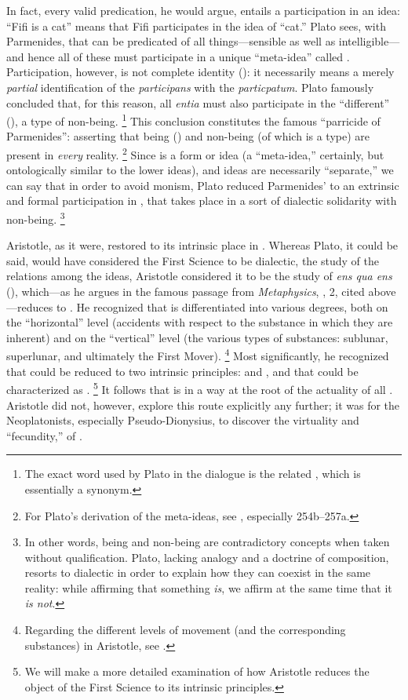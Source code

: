 %
In fact, every valid predication, he would argue, entails a participation in an idea: ``Fifi is a cat'' means that Fifi participates in the idea of ``cat.'' Plato sees, with Parmenides, that  can be predicated of all things---sensible as well as intelligible---and hence all of these must participate in a unique ``meta-idea'' called . Participation, however, is not complete identity (): it necessarily means a merely \emph{partial} identification of the \emph{participans} with the \emph{particpatum}. Plato famously concluded that, for this reason, all \emph{entia} must also participate in the ``different'' (), a type of non-being.%
%
\footnote{The exact word used by Plato in the dialogue is the related , which is essentially a synonym.} This conclusion constitutes the famous ``parricide of Parmenides'': asserting that being () and non-being (of which  is a type) are present in \emph{every} reality.%
%
\footnote{For Plato's derivation of the meta-ideas, see \cite[251b--259a]{plato:sophist}, especially 254b--257a.}
%
Since  is a form or idea (a ``meta-idea,'' certainly, but ontologically similar to the lower ideas), and ideas are necessarily ``separate,'' we can say that in order to avoid monism, Plato reduced Parmenides'  to an extrinsic and formal participation in , that takes place in a sort of dialectic solidarity with non-being.%
%
\footnote{In other words, being and non-being are contradictory concepts when taken without qualification. Plato, lacking analogy and a doctrine of composition, resorts to dialectic in order to explain how they can coexist in the same reality: while affirming that something \emph{is}, we affirm at the same time that it \emph{is not}.}

Aristotle, as it were, restored to  its intrinsic place in . Whereas Plato, it could be said, would have considered the First Science to be dialectic, the study of the relations among the ideas, Aristotle considered it to be the study of \emph{ens qua ens} (), which---as he argues in the famous passage from \emph{Metaphysics}, , 2, cited above---reduces to . He recognized that  is differentiated into various degrees, both on the ``horizontal'' level (accidents with respect to the substance in which they are inherent) and on the ``vertical'' level (the various types of substances: sublunar, superlunar, and ultimately the First Mover).%
%
\footnote{Regarding the different levels of movement (and the corresponding substances) in Aristotle, see \cite[401--402]{mitchell:four}.}
%
Most significantly, he recognized that  could be reduced to two intrinsic principles:  and , and that  could be characterized as .%
%
\footnote{We will make a more detailed examination of how Aristotle reduces the object of the First Science to its intrinsic principles.} It follows that  is in a way at the root of the actuality of all .  Aristotle did not, however, explore this route explicitly any further; it was for the Neoplatonists, especially Pseudo-Dionysius, to discover the virtuality and ``fecundity,'' of .

